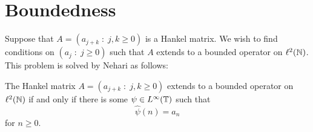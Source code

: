 \documentclass{unswmaths}
\begin{document}
\section*{Boundedness}
    Suppose that $A = (a_{j+k}\;:\;j,k\geq 0)$ is a Hankel matrix. We wish to find
    conditions on $(a_j\;:\;j\geq 0)$ such that $A$ extends to a bounded operator on $\ell^2(\mathbb{N})$. 
    This problem is solved by Nehari %
    as follows:
    \begin{theorem}
        The Hankel matrix $A = (a_{j+k}\;:\;j,k\geq 0)$ extends to a bounded operator on $\ell^2(\mathbb{N})$
        if and only if there is some $\psi \in L^\infty(\mathbb{T})$ such that
        \begin{equation*}
            \hat{\psi}(n) = a_n
        \end{equation*}
        for $n\geq 0$.
    \end{theorem}
\end{document}
